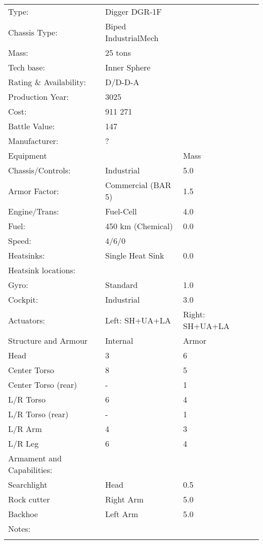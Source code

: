 \documentclass{tufte-book}
\begin{document}
\bigskip
\begin{minipage}{\textwidth}
\begin{center}
\begin{tabular}{llll}
\toprule
Type: & Digger DGR-1F & \\
Chassis Type: & Biped IndustrialMech & \\
Mass: & 25 tons & \\
Tech base: & Inner Sphere & \\
Rating \& Availability: & D/D-D-A & \\
Production Year: & 3025 & \\
Cost: & 911 271 & \\
Battle Value: & 147 & \\
Manufacturer: & ? & \\
Equipment & & Mass \\
\quad Chassis/Controls: & Industrial & 5.0 \\
\quad Armor Factor: & Commercial (BAR 5) & 1.5 \\
\quad Engine/Trans: & Fuel-Cell & 4.0 \\
\quad Fuel: & 450 km (Chemical) & 0.0 \\
\quad Speed: & \multicolumn{2}{l}{4/6/0} \\
\quad Heatsinks: & Single Heat Sink & 0.0 \\
\quad Heatsink locations: &  & \\
\quad Gyro: & Standard & 1.0 \\
\quad Cockpit: & Industrial & 3.0 \\
\quad Actuators: & Left: SH+UA+LA & Right: SH+UA+LA \\
Structure and Armour & Internal & Armor \\
\quad Head & 3 & 6 \\
\quad Center Torso & 8 & 5 \\
\quad Center Torso (rear) & - & 1 \\
\quad L/R Torso & 6 & 4 \\
\quad L/R Torso (rear) & - & 1 \\
\quad L/R Arm & 4 & 3 \\
\quad L/R Leg & 6 & 4 \\

Armament and Capabilities: & & \\
\quad Searchlight & Head & 0.5 \\
\quad Rock cutter & Right Arm & 5.0 \\
\quad Backhoe & Left Arm & 5.0 \\

Notes: & & \\
\multicolumn{3}{l}{\quad } \\

\bottomrule
\end{tabular}
\end{center}
\end{minipage}
\end{document}
